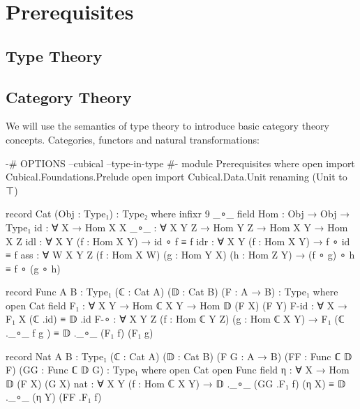 \chapter{Prerequisites}

\section{Type Theory}

\section{Category Theory}

We will use the semantics of type theory to introduce basic category theory concepts. Categories, functors and natural transformations:

\begin{code}[hide]
{-# OPTIONS --cubical --type-in-type #-}
module Prerequisites where
open import Cubical.Foundations.Prelude
open import Cubical.Data.Unit renaming (Unit to ⊤)
\end{code}

\begin{code}
record Cat (Obj : Type₁) : Type₂ where
  infixr 9 _∘_
  field
    Hom : Obj → Obj → Type₁
    id : ∀ {X} → Hom X X
    _∘_ : ∀ {X Y Z} → Hom Y Z → Hom X Y → Hom X Z
    idl : ∀ {X Y} (f : Hom X Y) → id ∘ f ≡ f
    idr : ∀ {X Y} (f : Hom X Y) → f ∘ id ≡ f
    ass : ∀ {W X Y Z} (f : Hom X W) (g : Hom Y X) (h : Hom Z Y)
          → (f ∘ g) ∘ h ≡ f ∘ (g ∘ h)

record Func {A B : Type₁} (ℂ : Cat A) (𝔻 : Cat B) (F : A → B) : Type₁ where
  open Cat
  field
    F₁ : ∀ {X Y} → Hom ℂ X Y → Hom 𝔻 (F X) (F Y)
    F-id : ∀ {X} → F₁ {X} (ℂ .id) ≡ 𝔻 .id
    F-∘ : ∀ {X Y Z} (f : Hom ℂ Y Z) (g : Hom ℂ X Y)
          → F₁ (ℂ ._∘_ f g ) ≡ 𝔻 ._∘_ (F₁ f) (F₁ g)

record Nat {A B : Type₁} (ℂ : Cat A) (𝔻 : Cat B)
  (F G : A → B) (FF : Func ℂ 𝔻 F) (GG : Func ℂ 𝔻 G) : Type₁ where
  open Cat
  open Func
  field
    η : ∀ X → Hom 𝔻 (F X) (G X)
    nat : ∀ {X Y} (f : Hom ℂ X Y)
      → 𝔻 ._∘_ (GG .F₁ f) (η X) ≡ 𝔻 ._∘_ (η Y) (FF .F₁ f)
\end{code}